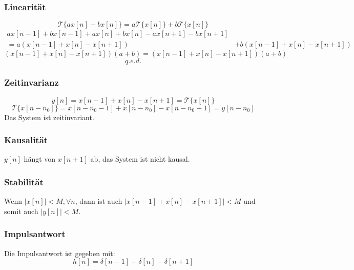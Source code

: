 \begin{enumerate}[a)]
	\subsubsection*{Linearität}
		\[ \mathcal{T} \{ ax[n]+bx[n] \} = a\mathcal{T} \{ x[n] \}+ b \mathcal{T} \{ x[n] \} \]
		\begin{align*}
			ax[n-1]+bx[n-1]+ax[n]+bx[n]-ax[n+1]-bx[n+1] & \\
								= a(x[n-1]+x[n]-x[n+1])&+b(x[n-1]+x[n]-x[n+1])
		\end{align*}
		\[ (x[n-1]+x[n]-x[n+1])(a+b) = (x[n-1]+x[n]-x[n+1])(a+b) \]
		\[ q.e.d. \]
	\subsubsection*{Zeitinvarianz}
		\[ y[n] = x[n-1]+x[n]-x[n+1] = \mathcal{T} \{ x[n] \} \]
		\[ \mathcal{T} \{ x[n-n_0] \} = x[n-n_0-1]+x[n-n_0]-x[n-n_0+1] = y[n-n_0] \]
		Das System ist zeitinvariant.
	\subsubsection*{Kausalität}
		$y[n]$ hängt von $x[n+1]$ ab, das System ist nicht kausal.
	\subsubsection*{Stabilität}
		Wenn $|x[n]| < M, \forall n$, dann ist auch $|x[n-1]+x[n]-x[n+1]|<M$ und somit auch $|y[n]|<M$.
	\subsubsection*{Impulsantwort}
		Die Impulsantwort ist gegeben mit:
		\[ h[n] = \delta [n-1] + \delta [n] - \delta[n+1] \]
\end{enumerate}